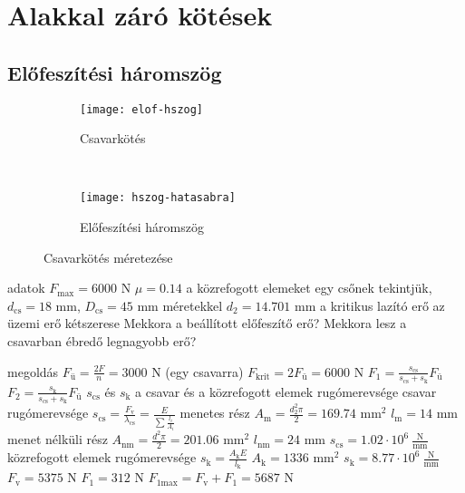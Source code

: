 \section{Alakkal záró kötések}%

\subsection{Előfeszítési háromszög}%

\begin{wrapfigure}{R}{.28\textwidth}
	\centering
	\vspace{-3cm}
	\begin{subfigure}{\linewidth}
		\centering
		\texttt{[image: elof-hszog]}
		\caption{Csavarkötés}
	\end{subfigure}\\[3mm]
	\begin{subfigure}{\linewidth}
		\centering
		\texttt{[image: hszog-hatasabra]}
		\caption{Előfeszítési háromszög}
	\end{subfigure}
	\caption{Csavarkötés méretezése}
\end{wrapfigure}
\parbox{.65\textwidth}{
\begin{outline}
	\1 adatok
		\2 $F_\text{max} = 6000$ N
		\2 $\mu = 0.14$
		\2 a közrefogott elemeket egy csőnek tekintjük, $d_\text{cs}=18$ mm, $D_\text{cs}=45$ mm méretekkel
		\2 $d_2 = 14.701$ mm
		\2 a kritikus lazító erő az üzemi erő kétszerese
		\2 Mekkora a beállított előfeszítő erő?
		\2 Mekkora lesz a csavarban ébredő legnagyobb erő?
\end{outline}}
\begin{outline}
	\1 megoldás
		\2 $F_\text{ü} = \frac{2F}{n} = 3000$ N (egy csavarra)
		\2 $F_\text{krit} = 2F_\text{ü} = 6000$ N
		\2 $F_1 = \frac{s_\text{cs}}{s_\text{cs}+s_\text{k}}F_\text{ü}$ 
		\2 $F_2 = \frac{s_\text{k}}{s_\text{cs}+s_\text{k}}F_\text{ü}$ 
		\2 $s_\text{cs}$ és $s_\text{k}$ a csavar és a közrefogott elemek rugómerevsége
		\2 csavar rugómerevsége
			\3 $s_\text{cs} = \frac{F_\text{v}}{\lambda_\text{cs}}=\frac{E}{\sum\frac{l_i}{A_i}}$
			\3 menetes rész
				\4 $A_\text{m} = \frac{d_2^2\pi}{2} = 169.74\text{ mm}^2$
				\4 $l_\text{m} = 14$ mm
			\3 menet nélküli rész
				\4 $A_\text{nm} = \frac{d^2\pi}{2} = 201.06\text{ mm}^2$
				\4 $l_\text{nm} = 24$ mm
			\3 $s_\text{cs} = 1.02\cdot 10^6~\frac{\text{N}}{\text{mm}}$
		\2 közrefogott elemek rugómerevsége
			\3 $s_\text{k} = \frac{A_\text{k}E}{l_\text{k}}$
			\3 $A_\text{k} = 1336\text{ mm}^2$
			\3 $s_\text{k} = 8.77\cdot 10^6~\frac{\text{N}}{\text{mm}}$
		\2 $F_\text{v} = 5375$ N
		\2 $F_1 = 312$ N
		\2 $F_{1\text{max}} = F_\text{v}+F_1 = 5687$ N
\end{outline}

